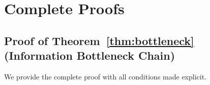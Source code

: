 \documentclass{article}
\begin{document}




\appendix

\section{Complete Proofs}
\label{app:proofs}

\subsection{Proof of Theorem~\ref{thm:bottleneck} (Information Bottleneck Chain)}
\label{app:proof_bottleneck}

We provide the complete proof with all conditions made explicit.
\end{document}
